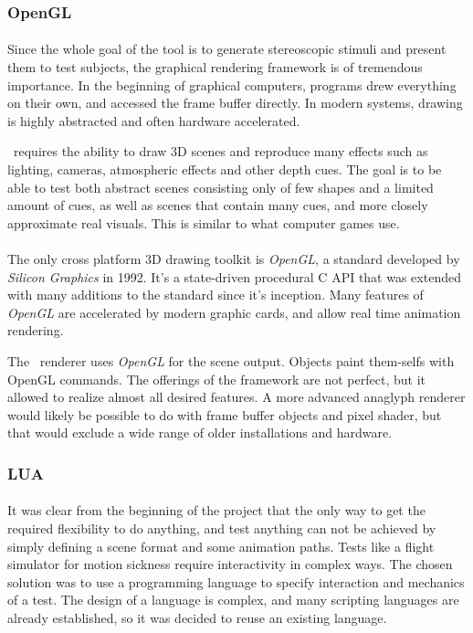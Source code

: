 \subsubsection{OpenGL\label{FrameworkOpenGL}}
\paragraph{}
Since the whole goal of the tool is to generate stereoscopic stimuli and present them to test subjects,
the graphical rendering framework is of tremendous importance.
In the beginning of graphical computers, programs drew everything on their own, and accessed the frame buffer directly.
In modern systems, drawing is highly abstracted and often hardware accelerated.

\ER\ requires the ability to draw 3D scenes and reproduce many effects such as lighting, cameras, atmospheric effects and other depth cues.
The goal is to be able to test both abstract scenes consisting only of few shapes and a limited amount of cues,
as well as scenes that contain many cues, and more closely approximate real visuals.
This is similar to what computer games use.

\paragraph{}
The only cross platform 3D drawing toolkit is \textit{OpenGL}\cite{opengl}, a standard developed by \textit{Silicon Graphics} in 1992.
It's a state-driven procedural C API that was extended with many additions to the standard since it's inception.
Many features of \textit{OpenGL} are accelerated by modern graphic cards, and allow real time animation rendering.

The \ER\ renderer uses \textit{OpenGL} for the scene output.
Objects paint them-selfs with OpenGL commands.
The offerings of the framework are not perfect, but it allowed to realize almost all desired features.
A more advanced anaglyph renderer would likely be possible to do with frame buffer objects and pixel shader, but that would exclude a wide range of older installations and hardware.


\subsubsection{LUA\label{FrameworkLua}}
\paragraph{}
It was clear from the beginning of the project that the only way to get the required flexibility to do anything, and test anything can not be achieved by simply defining a scene format and some animation paths.
Tests like a flight simulator for motion sickness require interactivity in complex ways.
The chosen solution was to use a programming language to specify interaction and mechanics of a test.
The design of a language is complex, and many scripting languages are already established, so it was decided to reuse an existing language.

